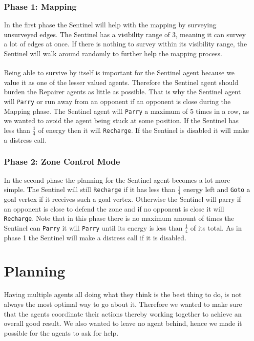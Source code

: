 \documentclass[11pt]{article}
\begin{document}
\subsubsection*{Phase 1: Mapping}
In the first phase the Sentinel will help with the mapping by surveying unsurveyed edges. The Sentinel has a visibility range of 3, meaning it can survey a lot of edges at once. If there is nothing to survey within its visibility range, the Sentinel will walk around randomly to further help the mapping process.\\
\\
Being able to survive by itself is important for the Sentinel agent because we value it as one of the lesser valued agents. Therefore the Sentinel agent should burden the Repairer agents as little as possible. That is why the Sentinel agent will {\tt Parry} or run away from an opponent if an opponent is close during the Mapping phase. The Sentinel agent will {\tt Parry} a maximum of 5 times in a row, as we wanted to avoid the agent being stuck at some position. If the Sentinel has less than $\frac{1}{4}$ of energy then it will {\tt Recharge}. If the Sentinel is disabled it will make a distress call.
 
\subsubsection*{Phase 2: Zone Control Mode}
In the second phase the planning for the Sentinel agent becomes a lot more simple. The Sentinel will still {\tt Recharge} if it has less than $\frac{1}{4}$ energy left and {\tt Goto} a goal vertex if it receives such a goal vertex. Otherwise the Sentinel will parry if an opponent is close to defend the zone and if no opponent is close it will {\tt Recharge}. Note that in this phase there is no maximum amount of times the Sentinel can {\tt Parry} it will {\tt Parry} until its energy is less than $\frac{1}{4}$ of its total. As in phase 1 the Sentinel will make a distress call if it is disabled.

\section{Planning}
Having multiple agents all doing what they think is the best thing to do, is not always the most optimal way to go about it. Therefore we wanted to make sure that the agents coordinate their actions thereby working together to achieve an overall good result. We also wanted to leave no agent behind, hence we made it possible for the agents to ask for help.
\end{document}
